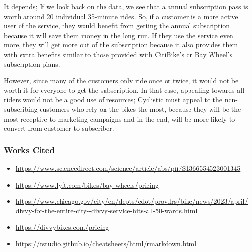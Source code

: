 \documentclass[
]{article}
\providecommand{\tightlist}{%
  \setlength{\itemsep}{0pt}\setlength{\parskip}{0pt}}
\begin{document}
It depends; If we look back on the data, we see that a annual
subscription pass is worth around 20 individual 35-minute rides. So, if
a customer is a more active user of the service, they would benefit from
getting the annual subscription because it will save them money in the
long run. If they use the service even more, they will get more out of
the subscription because it also provides them with extra benefits
similar to those provided with CitiBike's or Bay Wheel's subscription
plans.

However, since many of the customers only ride once or twice, it would
not be worth it for everyone to get the subscription. In that case,
appealing towards all riders would not be a good use of resources;
Cyclistic must appeal to the non-subscribing customers who rely on the
bikes the most, because they will be the most receptive to marketing
campaigns and in the end, will be more likely to convert from customer
to subscriber.

\subsubsection{Works Cited}\label{works-cited}

\begin{itemize}
\tightlist
\item
  \url{https://www.sciencedirect.com/science/article/abs/pii/S1366554523001345}
\item
  \url{https://www.lyft.com/bikes/bay-wheels/pricing}
\item
  \url{https://www.chicago.gov/city/en/depts/cdot/provdrs/bike/news/2023/april/divvy-for-the-entire-city--divvy-service-hits-all-50-wards.html}
\item
  \url{https://divvybikes.com/pricing}
\item
  \url{https://rstudio.github.io/cheatsheets/html/rmarkdown.html}
\end{itemize}
\end{document}
